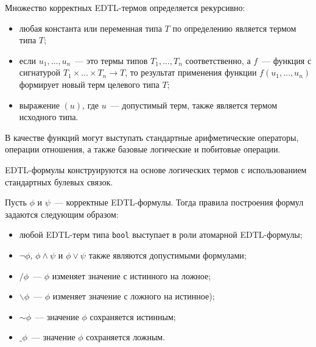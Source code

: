 \begin{definition}\label{def:edtl_terms}

    Множество корректных EDTL-термов определяется рекурсивно:
    \begin{itemize}
        \item любая константа или переменная типа $T$ по определению является термом типа $T$;
        \item если $u_1, \dots, u_n$~--- это термы типов $T_1, \dots, T_n$ соответственно, а $f$~--- функция с сигнатурой $T_1 \times \dots \times T_n \to T$, то результат применения функции $f(u_1, \dots, u_n)$ формирует новый терм целевого типа $T$;
        \item выражение $(u)$, где $u$~--- допустимый терм, также является термом исходного типа.
    \end{itemize}
    В качестве функций могут выступать стандартные арифметические операторы, операции отношения, а также базовые логические и побитовые операции.
\end{definition}

\begin{definition}\label{def:edtl_formulas}
    EDTL-формулы конструируются на основе логических термов с использованием стандартных булевых связок. 
    
    Пусть $\phi$ и $\psi$~--- корректные EDTL-формулы. Тогда правила построения формул задаются следующим образом:
    \begin{itemize}
        \item любой EDTL-терм типа \texttt{bool} выступает в роли атомарной EDTL-формулы;
        \item $\neg\phi$, $\phi \land \psi$ и $\phi \lor \psi$ также являются допустимыми формулами;
        \item $/\phi$~--- $\phi$ изменяет значение с истинного на ложное;
        \item $\backslash\phi$~--- $\phi$ изменяет значение с ложного на истинное);
        \item $\sim\phi$~--- значение $\phi$ сохраняется истинным;
        \item $\_\phi$~--- значение $\phi$ сохраняется ложным.
    \end{itemize}
\end{definition}


